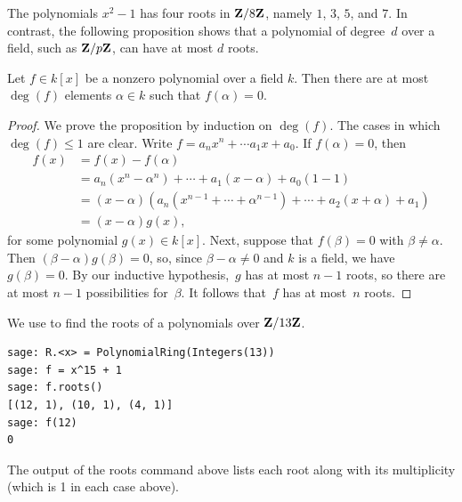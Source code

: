 The polynomials $x^2-1$ has four roots in $\mathbf{Z}/8\mathbf{Z}{}$, namely
$1$, $3$, $5$, and $7$.   In contrast, the following proposition
shows that a polynomial of degree~$d$ over a field,
such as $\mathbf{Z}/p\mathbf{Z}{}$, can have at most $d$ roots.
\begin{proposition}\label{prop:atmost}
Let $f\in k[x]$ be a nonzero polynomial
over a field $k$.  Then there are at most
$\deg(f)$ elements $\alpha\in k$ such that $f(\alpha)=0$.
\end{proposition}
\begin{proof}
We prove the proposition by induction on $\deg(f)$.  The cases in
which
$\deg(f)\leq 1$ are clear.  Write
$f = a_n x^n + \cdots a_1 x + a_0$.  If
$f(\alpha)=0$, then
\begin{align*}
 f(x) &= f(x) - f(\alpha)\\
      &= a_n(x^n-\alpha^n) + \cdots + a_1(x-\alpha) + a_0(1-1)\\
      &= (x-\alpha)(a_n(x^{n-1}+\cdots + \alpha^{n-1}) + \cdots + a_2(x+\alpha) + a_1)\\
      &= (x-\alpha)g(x),
\end{align*}
for some polynomial $g(x)\in k[x]$.
Next, suppose that $f(\beta)=0$ with $\beta\neq \alpha$.  Then
$(\beta-\alpha) g(\beta) = 0$, so, since $\beta-\alpha\neq 0$ and $k$
is a field,  we have $g(\beta)=0$.
By our inductive hypothesis,~$g$ has at most $n-1$ roots, so
there are at most $n-1$ possibilities for~$\beta$.
It follows that~$f$ has at most~$n$ roots.
\end{proof}

\begin{sg}
We use \sage to find the roots of a polynomials over $\mathbf{Z}/13\mathbf{Z}{}$.
\begin{verbatim}
sage: R.<x> = PolynomialRing(Integers(13))
sage: f = x^15 + 1
sage: f.roots()
[(12, 1), (10, 1), (4, 1)]
sage: f(12)
0
\end{verbatim}
The output of the roots command above lists each root along
with its multiplicity (which is 1 in each case above).
\end{sg}

